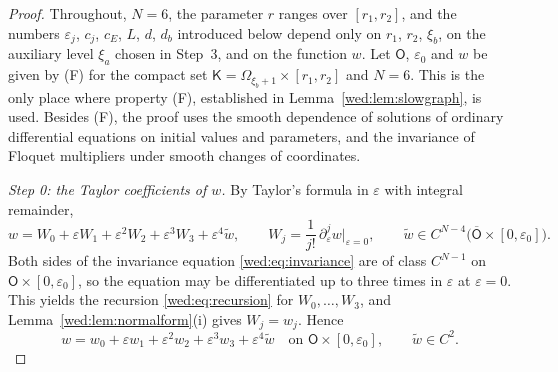 \begin{proof}
Throughout, $N=6$, the parameter $r$ ranges over $[r_1,r_2]$, and the numbers $\varepsilon_j$, $c_j$, $c_E$, $L$, $d$, $d_b$ introduced below depend only on $r_1$, $r_2$, $\xi_b$, on the auxiliary level $\xi_a$ chosen in Step~3, and on the function $w$. Let $\mathsf O$, $\varepsilon_0$ and $w$ be given by \textup{(F)} for the compact set $\mathsf K=\Omega_{\xi_b+1}\times[r_1,r_2]$ and $N=6$. This is the only place where property \textup{(F)}, established in Lemma~\ref{wed:lem:slowgraph}, is used. Besides \textup{(F)}, the proof uses the smooth dependence of solutions of ordinary differential equations on initial values and parameters, and the invariance of Floquet multipliers under smooth changes of coordinates.

\emph{Step 0: the Taylor coefficients of $w$.} By Taylor's formula in $\varepsilon$ with integral remainder,
\[
w=W_0+\varepsilon W_1+\varepsilon^2W_2+\varepsilon^3W_3+\varepsilon^4\tilde w,\qquad
W_j=\frac1{j!}\,\partial_\varepsilon^jw\big|_{\varepsilon=0},\qquad \tilde w\in C^{N-4}\bigl(\overline{\mathsf O}\times[0,\varepsilon_0]\bigr).
\]
Both sides of the invariance equation \eqref{wed:eq:invariance} are of class $C^{N-1}$ on $\mathsf O\times[0,\varepsilon_0]$, so the equation may be differentiated up to three times in $\varepsilon$ at $\varepsilon=0$. This yields the recursion \eqref{wed:eq:recursion} for $W_0,\dots,W_3$, and Lemma~\ref{wed:lem:normalform}(i) gives $W_j=w_j$. Hence
\begin{equation}\label{wed:eq:wexpansion}
w=w_0+\varepsilon w_1+\varepsilon^2w_2+\varepsilon^3w_3+\varepsilon^4\tilde w\quad\text{on }\mathsf O\times[0,\varepsilon_0],\qquad \tilde w\in C^{2}.
\end{equation}


\end{proof}
